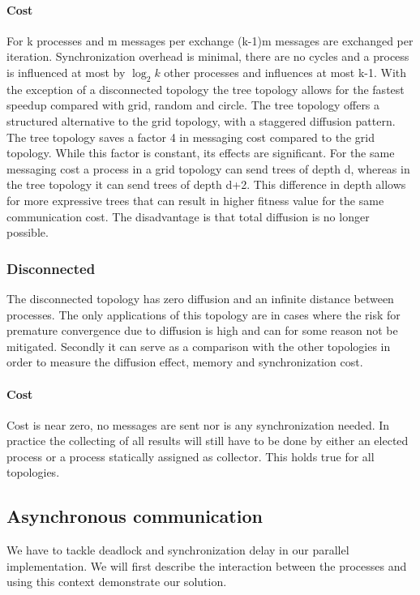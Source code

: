 \paragraph{Cost}
For k processes and m messages per exchange (k-1)m messages are exchanged per iteration. Synchronization overhead is minimal, there are no cycles and a process is influenced at most by $\log_2{k}$ other processes and influences at most k-1. With the exception of a disconnected topology the tree topology allows for the fastest speedup compared with grid, random and circle. 
The tree topology offers a structured alternative to the grid topology, with a staggered diffusion pattern. 
The tree topology saves a factor 4 in messaging cost compared to the grid topology. While this factor is constant, its effects are significant. 
For the same messaging cost a process in a grid topology can send trees of depth d, whereas in the tree topology it can send trees of depth d+2. This difference in depth allows for more expressive trees that can result in higher fitness value for the same communication cost. The disadvantage is that total diffusion is no longer possible.

\subsubsection{Disconnected}
The disconnected topology has zero diffusion and an infinite distance between processes. The only applications of this topology are in cases where the risk for premature convergence due to diffusion is high and can for some reason not be mitigated. Secondly it can serve as a comparison with the other topologies in order to measure the diffusion effect, memory and synchronization cost. 

\paragraph{Cost}
Cost is near zero, no messages are sent nor is any synchronization needed. In practice the collecting of all results will still have to be done by either an elected process or a process statically assigned as collector. This holds true for all topologies.

\subsection{Asynchronous communication}\label{subasync}
We have to tackle deadlock and synchronization delay in our parallel implementation. We will first describe the interaction between the processes and using this context demonstrate our solution.

